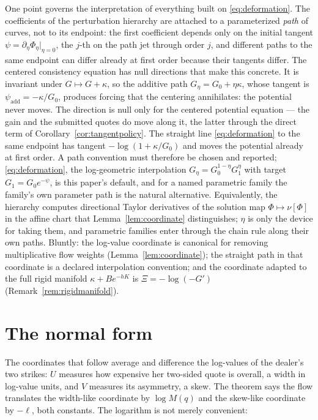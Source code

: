 \documentclass[11pt]{article}
\begin{document}
One point governs the interpretation of everything built on \eqref{eq:deformation}. The coefficients of the perturbation hierarchy are attached to a parameterized \emph{path} of curves, not to its endpoint: the first coefficient depends only on the initial tangent $\psi = \partial_\eta \Phi_\eta|_{\eta=0}$, the $j$-th on the path jet through order $j$, and different paths to the same endpoint can differ already at first order because their tangents differ. The centered consistency equation has null directions that make this concrete. It is invariant under $G \mapsto G + \kappa$, so the additive path $G_\eta = G_0 + \eta\kappa$, whose tangent is $\psi_{\mathrm{add}} = -\kappa/G_0$, produces forcing that the centering annihilates: the potential never moves. The direction is null only for the centered potential equation --- the gain and the submitted quotes do move along it, the latter through the direct term of Corollary~\ref{cor:tangentpolicy}. The straight line \eqref{eq:deformation} to the same endpoint has tangent $-\log(1 + \kappa/G_0)$ and moves the potential already at first order. A path convention must therefore be chosen and reported; \eqref{eq:deformation}, the log-geometric interpolation $G_\eta = G_0^{1-\eta}G_1^{\eta}$ with target $G_1 = G_0 e^{-\psi}$, is this paper's default, and for a named parametric family the family's own parameter path is the natural alternative. Equivalently, the hierarchy computes directional Taylor derivatives of the solution map $\Phi \mapsto \nu[\Phi]$ in the affine chart that Lemma~\ref{lem:coordinate} distinguishes; $\eta$ is only the device for taking them, and parametric families enter through the chain rule along their own paths. Bluntly: the log-value coordinate is canonical for removing multiplicative flow weights (Lemma~\ref{lem:coordinate}); the straight path in that coordinate is a declared interpolation convention; and the coordinate adapted to the full rigid manifold $\kappa + Be^{-hK}$ is $\Xi = -\log(-G')$ (Remark~\ref{rem:rigidmanifold}).

\section{The normal form}\label{sec:normalform}

The coordinates that follow average and difference the log-values of the dealer's two strikes: $U$ measures how expensive her two-sided quote is overall, a width in log-value units, and $V$ measures its asymmetry, a skew. The theorem says the flow translates the width-like coordinate by $\log M(q)$ and the skew-like coordinate by $-\ell$, both constants. The logarithm is not merely convenient:
\end{document}
